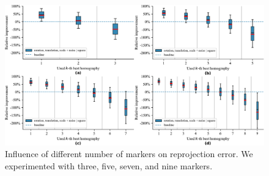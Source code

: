 \begin{figure}[t]
    \centering
    \includegraphics[width=\linewidth]{figures/homography/n_markers_influence.pdf}
    \caption{Influence of different number of markers on reprojection error. We experimented with  three,  five,  seven, and  nine markers.}
    \label{fig:NMarkersInfluence}
\end{figure}

